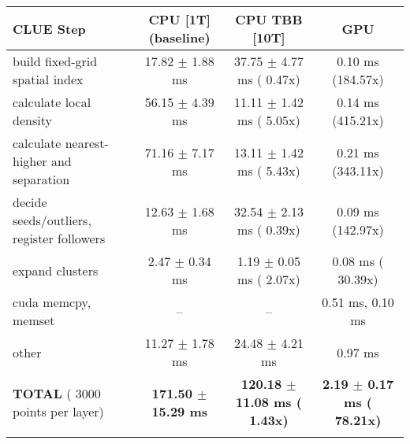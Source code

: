     \begin{tabular}{l|c|c|c}
    \hline
    CLUE Step                                 & CPU [1T] (baseline)         & CPU TBB [10T]                         & GPU                       \\ \hline
    build fixed-grid spatial index            &  17.82 $\pm$  1.88 ms       &  37.75 $\pm$  4.77 ms ( 0.47x)        &   0.10 ms (184.57x)       \\
    calculate local density                   &  56.15 $\pm$  4.39 ms       &  11.11 $\pm$  1.42 ms ( 5.05x)        &   0.14 ms (415.21x)       \\
    calculate nearest-higher and separation   &  71.16 $\pm$  7.17 ms       &  13.11 $\pm$  1.42 ms ( 5.43x)        &   0.21 ms (343.11x)       \\
    decide seeds/outliers, register followers &  12.63 $\pm$  1.68 ms       &  32.54 $\pm$  2.13 ms ( 0.39x)        &   0.09 ms (142.97x)       \\
    expand clusters                           &   2.47 $\pm$  0.34 ms       &   1.19 $\pm$  0.05 ms ( 2.07x)        &   0.08 ms ( 30.39x)       \\ \hline
    cuda memcpy, memset                       & --                          & --                                    &   0.51 ms,   0.10 ms      \\ 
    other                                     &  11.27 $\pm$  1.78 ms       &  24.48 $\pm$  4.21 ms                 &   0.97 ms                 \\ \hline
    \textbf{TOTAL} ( 3000 points per layer)   & \textbf{171.50 $\pm$ 15.29 ms} & \textbf{120.18 $\pm$ 11.08 ms ( 1.43x)} & \textbf{  2.19 $\pm$  0.17 ms ( 78.21x)}  \\
    \hline
    \multicolumn{4}{c}{} 
    \end{tabular}
    \linebreak


